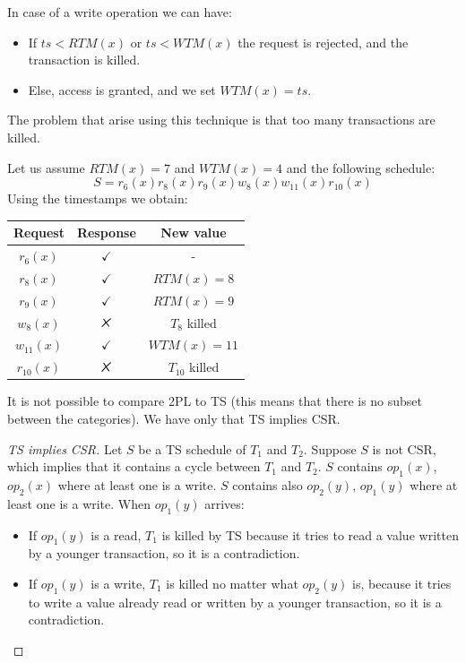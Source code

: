 \documentclass[12pt, a4paper]{report}
\newtheorem[style=M,bodystyle=\normalfont]{theorem}{Theorem}
\newtheorem[style=M,bodystyle=\normalfont]{corollary}{Corollary}
\newtheorem[style=M,bodystyle=\normalfont]{lemma}{Lemma}
\newtheorem[style=M,bodystyle=\normalfont]{definition}{Definition}
\newcommand{\tikzxmark}{%
\tikz[scale=0.23] {
    \draw[line width=0.7,line cap=round] (0,0) to [bend left=6] (1,1);
    \draw[line width=0.7,line cap=round] (0.2,0.95) to [bend right=3] (0.8,0.05);
}}
\begin{document}
    In case of a write operation we can have: 
    \begin{itemize}
        \item If $ts<RTM(x)$ or $ts<WTM(x)$ the request is rejected, and the  transaction is killed. 
        \item Else, access is granted, and we set $WTM(x)=ts$. 
    \end{itemize}
    The problem that arise using this technique is that too many transactions are killed. 
    \begin{example}
        Let us assume $RTM(x)=7$ and $WTM(x)=4$ and the following schedule: 
        \[S=r_6(x) r_8(x) r_9(x) w_8(x) w_{11}(x) r_{10}(x)\]
        Using the timestamps we obtain: 
        \begin{table}[H]
            \centering
            \begin{tabular}{ccc}
            \textbf{Request} & \textbf{Response} & \textbf{New value} \\ \hline
            $r_6(x)$         & $\checkmark$      & -                  \\
            $r_8(x)$         & $\checkmark$      & $RTM(x)=8$         \\
            $r_9(x)$         & $\checkmark$      & $RTM(x)=9$         \\
            $w_8(x)$         & $\tikzxmark$      & $T_8$ killed       \\
            $w_{11}(x)$      & $\checkmark$      & $WTM(x)=11$        \\
            $r_{10}(x)$      & $\tikzxmark$      & $T_{10}$ killed   
            \end{tabular}
        \end{table}
    \end{example}
    It is not possible to compare 2PL to TS (this means that there is no subset between the categories). We have only that TS implies CSR. 
    \begin{proof}[TS implies CSR]
        Let $S$ be a TS schedule of $T_1$ and $T_2$. Suppose $S$ is not CSR, which implies that it contains a cycle between $T_1$ and $T_2$. $S$ contains $op_1(x)$, $op_2(x)$ where at 
        least one is a write. $S$ contains also $op_2(y)$, $op_1(y)$ where at least one is a write. 
        When $op_1(y)$ arrives:
        \begin{itemize}
            \item If $op_1(y)$ is a read, $T_1$ is killed by TS because it tries to read a value written by a younger transaction, so it is a contradiction. 
            \item If $op_1(y)$ is a write, $T_1$ is killed no matter what $op_2(y)$ is, because it tries to write a value already read or written by a younger transaction, so it is a 
                contradiction. 
        \end{itemize}
    \end{proof}
\end{document}
